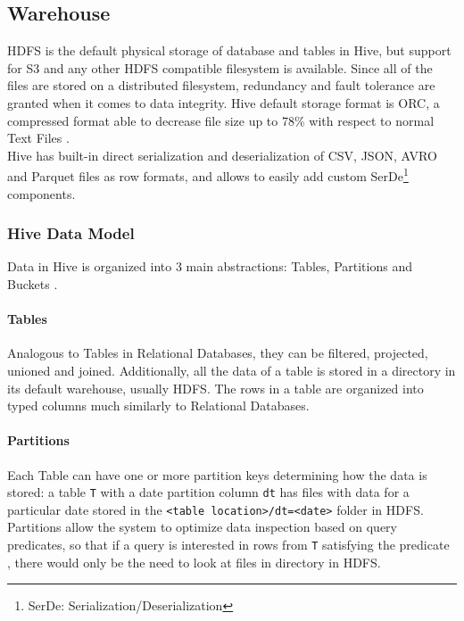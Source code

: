 \subsection{Warehouse}
HDFS is the default physical storage of database and tables in Hive, but support for S3 and any other HDFS compatible filesystem is available. Since all of the files are stored on a distributed filesystem, redundancy and fault tolerance are granted when it comes to data integrity. Hive default storage format is ORC, a compressed format able to decrease file size up to 78\% with respect to normal Text Files \cite{orc_format}.\\
Hive has built-in direct serialization and deserialization of CSV, JSON, AVRO and Parquet files as row formats, and allows to easily add custom SerDe\footnote{SerDe: Serialization/Deserialization} components.

\pagebreak

\subsubsection{Hive Data Model}

Data in Hive is organized into 3 main abstractions: Tables, Partitions and Buckets \cite{hive_design}.

\paragraph{Tables} Analogous to Tables in Relational Databases, they can be filtered, projected, unioned and joined. Additionally, all the data of a table is stored in a directory in its default warehouse, usually HDFS. The rows in a table are organized into typed columns much similarly to Relational Databases.
\paragraph{Partitions} Each Table can have one or more partition keys determining how the data is stored: a table \texttt{T} with a date partition column \texttt{dt} has files with data for a particular date stored in the \texttt{<table location>/dt=<date>} folder in HDFS. Partitions allow the system to optimize data inspection based on query predicates, so that if a query is interested in rows from \texttt{T} satisfying the predicate \texttt{}, there would only be the need to look at files in \texttt{} directory in HDFS.
